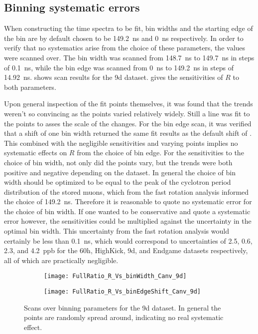 \subsection{Binning systematic errors}
\label{sub:binning_systematic_errors}


When constructing the time spectra to be fit, bin widths and the starting edge of the bin are by default chosen to be \SI{149.2}{ns} and \SI{0}{ns} respectively. In order to verify that no systematics arise from the choice of these parameters, the values were scanned over. The bin width was scanned from \SI{148.7}{ns} to \SI{149.7}{ns} in steps of \SI{0.1}{ns}, while the bin edge was scanned from \SI{0}{ns} to \SI{149.2}{ns} in steps of \SI{14.92}{ns}.  shows scan results for the 9d dataset.  gives the sensitivities of $R$ to both parameters. 

Upon general inspection of the fit points themselves, it was found that the trends weren't so convincing as the points varied relatively widely. Still a line was fit to the points to asses the scale of the changes. For the bin edge scan, it was verified that a shift of one bin width returned the same fit results as the default shift of . This combined with the negligible sensitivities and varying points implies no systematic effects on $R$ from the choice of bin edge. For the sensitivities to the choice of bin width, not only did the points vary, but the trends were both positive and negative depending on the dataset. In general the choice of bin width should be optimized to be equal to the peak of the cyclotron period distribution of the stored muons, which from the fast rotation analysis informed the choice of \SI{149.2}{ns}. Therefore it is reasonable to quote no systematic error for the choice of bin width. If one wanted to be conservative and quote a systematic error however, the sensitivities could be multiplied against the uncertainty in the optimal bin width. This uncertainty from the fast rotation analysis would certainly be less than \SI{0.1}{ns}, which would correspond to uncertainties of \SI{2.5}{}, \SI{0.6}{}, \SI{2.3}{}, and \SI{4.2}{ppb} for the 60h, HighKick, 9d, and Endgame datasets respectively, all of which are practically negligible.



\begin{figure}
\centering
    \begin{subfigure}[t]{0.45\textwidth}
        \centering
        \texttt{[image: FullRatio\_R\_Vs\_binWidth\_Canv\_9d]}
        \caption{}
    \end{subfigure}%
    \hspace{1cm}
    \begin{subfigure}[t]{0.45\textwidth}
        \centering
        \texttt{[image: FullRatio\_R\_Vs\_binEdgeShift\_Canv\_9d]}
        \caption{}
    \end{subfigure}
\caption[Scans over binning parameters]{Scans over binning parameters for the 9d dataset. In general the points are randomly spread around, indicating no real systematic effect.}
\label{fig:binParametersScan}
\end{figure}


